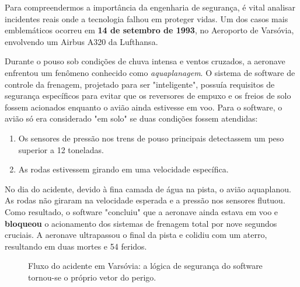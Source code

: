 \documentclass[12pt,a4paper,twoside]{report}
\begin{document}
Para compreendermos a importância da engenharia de segurança, é vital analisar incidentes reais onde a tecnologia falhou em proteger vidas. Um dos casos mais emblemáticos ocorreu em \textbf{14 de setembro de 1993}, no Aeroporto de Varsóvia, envolvendo um Airbus A320 da Lufthansa.

Durante o pouso sob condições de chuva intensa e ventos cruzados, a aeronave enfrentou um fenômeno conhecido como \emph{aquaplanagem}. O sistema de software de controle da frenagem, projetado para ser "inteligente", possuía requisitos de segurança específicos para evitar que os reversores de empuxo e os freios de solo fossem acionados enquanto o avião ainda estivesse em voo. Para o software, o avião só era considerado "em solo" se duas condições fossem atendidas:
\begin{enumerate}
    \item Os sensores de pressão nos trens de pouso principais detectassem um peso superior a 12 toneladas.
    \item As rodas estivessem girando em uma velocidade específica.
\end{enumerate}

No dia do acidente, devido à fina camada de água na pista, o avião aquaplanou. As rodas não giraram na velocidade esperada e a pressão nos sensores flutuou. Como resultado, o software "concluiu" que a aeronave ainda estava em voo e \textbf{bloqueou} o acionamento dos sistemas de frenagem total por nove segundos cruciais. A aeronave ultrapassou o final da pista e colidiu com um aterro, resultando em duas mortes e 54 feridos.

\begin{figure}[h]
    \centering
    \caption{Fluxo do acidente em Varsóvia: a lógica de segurança do software tornou-se o próprio vetor do perigo.}
\end{figure}
\end{document}

